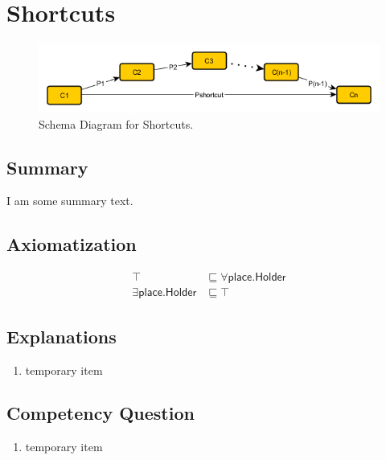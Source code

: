 \section{Shortcuts}
\label{sec:Shortcuts}
\begin{figure}[h!]
\begin{center}
\includegraphics[width=.4\textwidth]{figures/shortcuts}
\end{center}
\caption{Schema Diagram for Shortcuts.}
\label{fig:Shortcuts}
\end{figure}
\subsection{Summary}
\label{sum:Shortcuts}
I am some summary text.

\subsection{Axiomatization}
\label{axs:Shortcuts}
\begin{align}
\top &\sqsubseteq \forall\textsf{place.Holder} \\ 
\exists\textsf{place.Holder} &\sqsubseteq \top 
\end{align}

\subsection{Explanations}
\label{exp:Shortcuts}
\begin{enumerate}
\item temporary item
\end{enumerate}

\subsection{Competency Question}
\label{cqs:Shortcuts}
\begin{enumerate}[CQ1.]
\item temporary item
\end{enumerate}

\newpage
